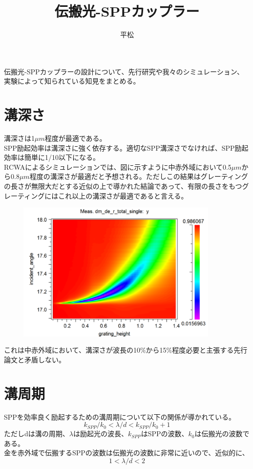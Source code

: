 \documentclass[11pt]{article}
\begin{document}
\title{伝搬光-SPPカップラー}
\author{平松}
\maketitle

\abstract
伝搬光-SPPカップラーの設計について、先行研究や我々のシミュレーション、実験によって知られている知見をまとめる。

\section{溝深さ}
溝深さは1$\mu m$程度が最適である。\\
SPP励起効率は溝深さに強く依存する。適切なSPP溝深さでなければ、SPP励起効率は簡単に1/10以下になる\cite{pitch_grating}。\\
RCWAによるシミュレーションでは、図に示すように中赤外域において0.5$\mu m$から0.8$\mu m$程度の溝深さが最適だと予想される。ただしこの結果はグレーティングの長さが無限大だとする近似の上で導かれた結論であって、有限の長さをもつグレーティングにはこれ以上の溝深さが最適であると言える。\\
\begin{figure}[H]
\centering
  \includegraphics[width=10cm]{./RCWA.pdf}
\end{figure}
これは中赤外域において、溝深さが波長の10$\%$から15$\%$程度必要と主張する先行論文と矛盾しない\cite{Anneal_MIR_grating}。

\section{溝周期}
SPPを効率良く励起するための溝周期について以下の関係が導かれている\cite{pitch_grating}。
\begin{equation}k_{SPP}/k_0 < \lambda / d < k_{SPP}/k_0 +1\end{equation}
ただしdは溝の周期、$\lambda$は励起光の波長、$k_{SPP}$はSPPの波数、$k_0$は伝搬光の波数である。\\金を赤外域で伝搬するSPPの波数は伝搬光の波数に非常に近いので、近似的に、\\
\begin{equation}1 < \lambda / d < 2\end{equation}
\end{document}
